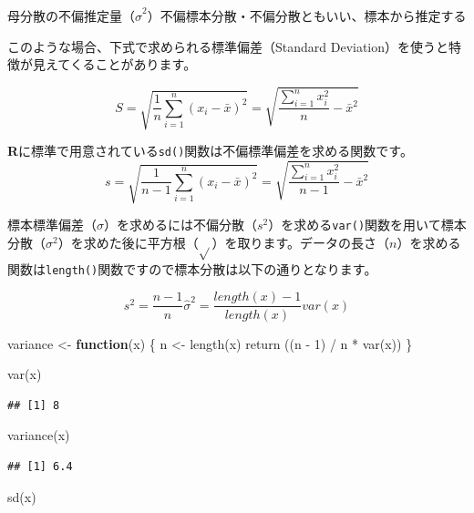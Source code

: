 \documentclass[
  12pt,
]{book}
\newenvironment{Shaded}{\begin{snugshade}}{\end{snugshade}}
\newcommand{\ControlFlowTok}[1]{\textcolor[rgb]{0.13,0.29,0.53}{\textbf{#1}}}
\newcommand{\DecValTok}[1]{\textcolor[rgb]{0.00,0.00,0.81}{#1}}
\newcommand{\FunctionTok}[1]{\textcolor[rgb]{0.00,0.00,0.00}{#1}}
\newcommand{\NormalTok}[1]{#1}
\newcommand{\OtherTok}[1]{\textcolor[rgb]{0.56,0.35,0.01}{#1}}
\newcommand{\SpecialCharTok}[1]{\textcolor[rgb]{0.00,0.00,0.00}{#1}}
\begin{document}
母分散の不偏推定量（\(\hat{\sigma}^2\)）不偏標本分散・不偏分散ともいい、標本から推定する

このような場合、下式で求められる標準偏差（Standard Deviation）を使うと特徴が見えてくることがあります。

\[S = \sqrt{\frac{1}{n} \sum_{i = 1}^n (x_i - \bar{x})^2} = \sqrt{\frac{\sum_{i = 1}^{n}x_{i}^2}{n} - \bar{x}^2 }\]

\textbf{R}に標準で用意されている\texttt{sd()}関数は不偏標準偏差を求める関数です。 \[s = \sqrt{\frac{1}{n - 1} \sum_{i = 1}^n (x_i - \bar{x})^2} = \sqrt{\frac{\sum_{i = 1}^{n}x_{i}^2}{n - 1} - \bar{x}^2 }\]

標本標準偏差（\(\sigma\)）を求めるには不偏分散（\(s^2\)）を求める\texttt{var()}関数を用いて標本分散（\(\sigma^2\)）を求めた後に平方根（\(\sqrt{}\)）を取ります。データの長さ（\(n\)）を求める関数は\texttt{length()}関数ですので標本分散は以下の通りとなります。

\[s^2 = \frac{n - 1}{n}\hat{\sigma}^2 = \frac{length(x) - 1}{length(x)}var(x)\]

\begin{Shaded}
\begin{Highlighting}[]
\NormalTok{variance }\OtherTok{\textless{}{-}} \ControlFlowTok{function}\NormalTok{(x) \{}
\NormalTok{  n }\OtherTok{\textless{}{-}} \FunctionTok{length}\NormalTok{(x)}
  \FunctionTok{return}\NormalTok{ ((n }\SpecialCharTok{{-}} \DecValTok{1}\NormalTok{) }\SpecialCharTok{/}\NormalTok{ n }\SpecialCharTok{*} \FunctionTok{var}\NormalTok{(x))}
\NormalTok{\}}


\FunctionTok{var}\NormalTok{(x)}
\end{Highlighting}
\end{Shaded}

\begin{verbatim}
## [1] 8
\end{verbatim}

\begin{Shaded}
\begin{Highlighting}[]
\FunctionTok{variance}\NormalTok{(x)}
\end{Highlighting}
\end{Shaded}

\begin{verbatim}
## [1] 6.4
\end{verbatim}

\begin{Shaded}
\begin{Highlighting}[]
\FunctionTok{sd}\NormalTok{(x)}
\end{Highlighting}
\end{Shaded}
\end{document}
